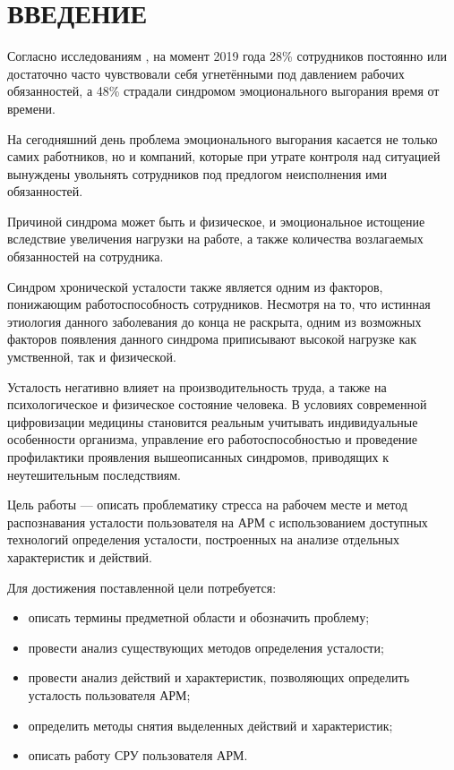 \section*{ВВЕДЕНИЕ}

Согласно исследованиям \cite{burnout}, на момент 2019 года 28\% сотрудников постоянно или достаточно часто чувствовали себя угнетёнными под давлением рабочих обязанностей, а 48\% страдали синдромом эмоционального выгорания время от времени.

На сегодняшний день проблема эмоционального выгорания касается не только самих работников, но и компаний, которые при утрате контроля над ситуацией вынуждены увольнять сотрудников под предлогом неисполнения ими обязанностей. \cite{CompanyProblem}

Причиной синдрома может быть и физическое, и эмоциональное истощение вследствие увеличения нагрузки на работе, а также количества возлагаемых обязанностей на сотрудника. \cite{Prichini}

Синдром хронической усталости также является одним из факторов, понижающим работоспособность сотрудников. Несмотря на то, что истинная этиология данного заболевания до конца не раскрыта, одним из возможных факторов появления данного синдрома приписывают высокой нагрузке как умственной, так и физической. \cite{SHU}

Усталость негативно влияет на производительность труда, а также на психологическое и физическое состояние человека. В условиях современной цифровизации медицины становится реальным учитывать индивидуальные особенности организма, управление его работоспособностью и проведение профилактики проявления вышеописанных синдромов, приводящих к неутешительным последствиям.

Цель работы --- описать проблематику стресса на рабочем месте и метод распознавания усталости пользователя на АРМ с использованием доступных технологий определения усталости, построенных на анализе отдельных характеристик и действий.

\pagebreak

Для достижения поставленной цели потребуется:
\begin{itemize}
\item описать термины предметной области и обозначить проблему;
\item провести анализ существующих методов определения усталости;
\item провести анализ действий и характеристик, позволяющих определить усталость пользователя АРМ;
\item определить методы снятия выделенных действий и характеристик;
\item описать работу СРУ пользователя АРМ.
\end{itemize}

\pagebreak